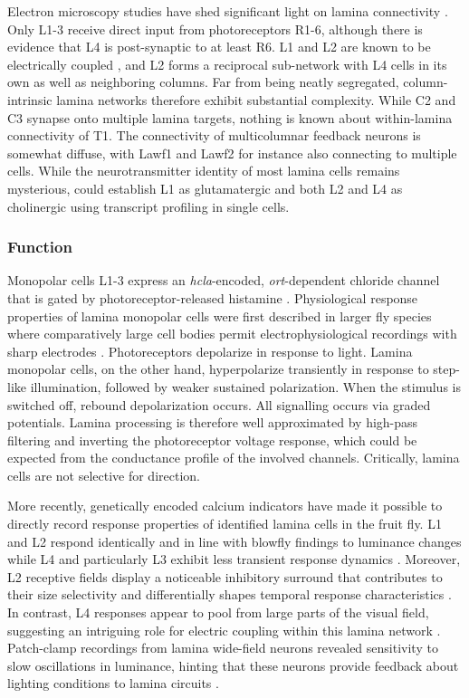 Electron microscopy studies have shed significant light on lamina connectivity \citep{Meinertzhagen:1991aa,RiveraAlba:2011dd}. Only L1-3 receive direct input from photoreceptors R1-6, although there is evidence that L4 is post-synaptic to at least R6. L1 and L2 are known to be electrically coupled \citep{Joesch:2010fw}, and L2 forms a reciprocal sub-network with L4 cells in its own as well as neighboring columns. Far from being neatly segregated, column-intrinsic lamina networks therefore exhibit substantial complexity. While C2 and C3 synapse onto multiple lamina targets, nothing is known about within-lamina connectivity of T1. The connectivity of multicolumnar feedback neurons is somewhat diffuse, with Lawf1 and Lawf2 for instance also connecting to multiple cells. While the neurotransmitter identity of most lamina cells remains mysterious, \citet{Takemura:2011iy} could establish L1 as glutamatergic and both L2 and L4 as cholinergic using transcript profiling in single cells.

\subsubsection{Function}
Monopolar cells L1-3 express an \textit{hcla}-encoded, \textit{ort}-dependent chloride channel that is gated by photoreceptor-released histamine \citep{Hardie:1989aa,Gengs:2002aa}. Physiological response properties of lamina monopolar cells were first described in larger fly species where comparatively large cell bodies permit electrophysiological recordings with sharp electrodes \citep{Laughlin:1978aa,Laughlin:1981wn,Laughlin:1989aa}. Photoreceptors depolarize in response to light. Lamina monopolar cells, on the other hand, hyperpolarize transiently in response to step-like illumination, followed by weaker sustained polarization. When the stimulus is switched off, rebound depolarization occurs. All signalling occurs via graded potentials. Lamina processing is therefore well approximated by high-pass filtering and inverting the photoreceptor voltage response, which could be expected from the conductance profile of the involved channels. Critically, lamina cells are not selective for direction.

More recently, genetically encoded calcium indicators have made it possible to directly record response properties of identified lamina cells in the fruit fly. L1 and L2 respond identically and in line with blowfly findings to luminance changes \citep{Reiff:2010eo,Clark:2011gw} while L4 and particularly L3 exhibit less transient response dynamics \citep{Silies:2013jp,Meier:2014fr}. Moreover, L2 receptive fields display a noticeable inhibitory surround that contributes to their size selectivity and differentially shapes temporal response characteristics \citep{Freifeld:2013gu}. In contrast, L4 responses appear to pool from large parts of the visual field, suggesting an intriguing role for electric coupling within this lamina network \citep{Meier:2014fr}. Patch-clamp recordings from lamina wide-field neurons revealed sensitivity to slow oscillations in luminance, hinting that these neurons provide feedback about lighting conditions to lamina circuits \citep{Tuthill:2014gc}.

